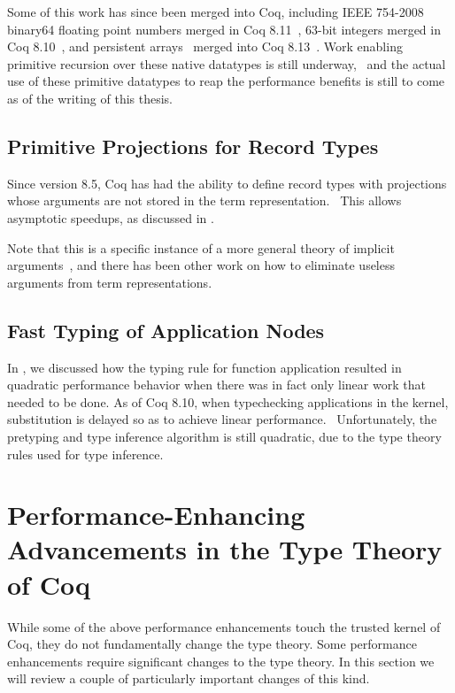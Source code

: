 Some of this work has since been merged into Coq, including IEEE 754-2008 binary64 floating point numbers merged in Coq 8.11~\cite{coq-pr-floats}, 63-bit integers merged in Coq 8.10~\cite{coq-pr-int63}, and persistent arrays~\cite{Persistent2007Conchon} merged into Coq 8.13~\cite{coq-pr-parray}.
Work enabling primitive recursion over these native datatypes is still underway,~\cite{coq-pr-parray-prim-recursion} and the actual use of these primitive datatypes to reap the performance benefits is still to come as of the writing of this thesis.

\subsection{Primitive Projections for Record Types}\label{sec:fixes:theory:primitive-projections}\label{sec:primitive-projections}
Since version 8.5, Coq has had the ability to define record types with projections whose arguments are not stored in the term representation.~\cite{coq-commit-polyproj}
This allows asymptotic speedups, as discussed in .

Note that this is a specific instance of a more general theory of implicit arguments~\cite{logical2001implicit,barras2008implicit}, and there has been other work on how to eliminate useless arguments from term representations.~\cite{Inductive2003Brady}

\subsection{Fast Typing of Application Nodes}
In , we discussed how the typing rule for function application resulted in quadratic performance behavior when there was in fact only linear work that needed to be done.
As of Coq 8.10, when typechecking applications in the kernel, substitution is delayed so as to achieve linear performance.~\cite{coq-pr-fast-application-typing}
Unfortunately, the pretyping and type inference algorithm is still quadratic, due to the type theory rules used for type inference.


\section{Performance-Enhancing Advancements in the Type Theory of Coq}\label{sec:fixes:coq-theory}
While some of the above performance enhancements touch the trusted kernel of Coq, they do not fundamentally change the type theory.
Some performance enhancements require significant changes to the type theory.
In this section we will review a couple of particularly important changes of this kind.

